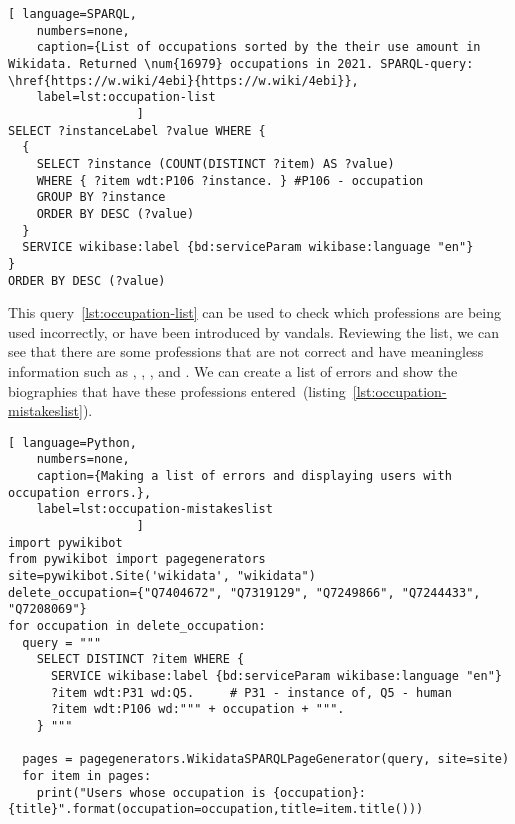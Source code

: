 \renewcommand{\lstlistingname}{Query} %
\begin{lstlisting}[ language=SPARQL,
    numbers=none,
    caption={List of occupations sorted by the their use amount in Wikidata. Returned \num{16979} occupations in 2021. SPARQL-query: \href{https://w.wiki/4ebi}{https://w.wiki/4ebi}},
    label=lst:occupation-list
                  ]
SELECT ?instanceLabel ?value WHERE {
  {
    SELECT ?instance (COUNT(DISTINCT ?item) AS ?value) 
    WHERE { ?item wdt:P106 ?instance. } #P106 - occupation
    GROUP BY ?instance
    ORDER BY DESC (?value)
  }
  SERVICE wikibase:label {bd:serviceParam wikibase:language "en"}
}
ORDER BY DESC (?value)
\end{lstlisting} 
\renewcommand{\lstlistingname}{Listing} %

This query~\ref{lst:occupation-list} 
can be used to check which professions are being used incorrectly, or have been introduced by vandals.
Reviewing the list, we can see that there are some professions 
that are not correct and have meaningless information
such as , , ,  and . 
We can create a list of errors and show the biographies that have these professions entered~(listing~\ref{lst:occupation-mistakeslist}).

\begin{widepar}%
	\captionsetup[lstlisting]{%
        format=llapwide16 %
	}%
\begin{lstlisting}[ language=Python,
    numbers=none,
    caption={Making a list of errors and displaying users with occupation errors.},
    label=lst:occupation-mistakeslist
                  ]
import pywikibot
from pywikibot import pagegenerators
site=pywikibot.Site('wikidata', "wikidata")
delete_occupation={"Q7404672", "Q7319129", "Q7249866", "Q7244433", "Q7208069"}
for occupation in delete_occupation:
  query = """
    SELECT DISTINCT ?item WHERE {
      SERVICE wikibase:label {bd:serviceParam wikibase:language "en"}
      ?item wdt:P31 wd:Q5.     # P31 - instance of, Q5 - human
      ?item wdt:P106 wd:""" + occupation + """.
    } """

  pages = pagegenerators.WikidataSPARQLPageGenerator(query, site=site)
  for item in pages:
    print("Users whose occupation is {occupation}: {title}".format(occupation=occupation,title=item.title()))
\end{lstlisting}%
\end{widepar}%

